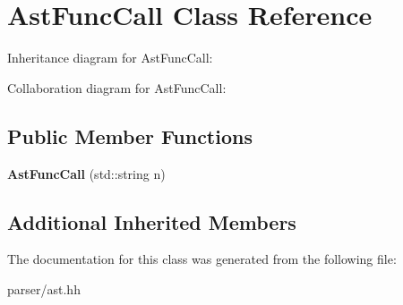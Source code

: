 \hypertarget{classAstFuncCall}{}\section{Ast\+Func\+Call Class Reference}
\label{classAstFuncCall}


Inheritance diagram for Ast\+Func\+Call\+:


Collaboration diagram for Ast\+Func\+Call\+:
\subsection*{Public Member Functions}
\begin{DoxyCompactItemize}
\item 
\mbox{\label{classAstFuncCall_a2ee7c8ccb1818844475b989974569f35}} 
{\bfseries Ast\+Func\+Call} (std\+::string n)
\end{DoxyCompactItemize}
\subsection*{Additional Inherited Members}


The documentation for this class was generated from the following file\+:\begin{DoxyCompactItemize}
\item 
parser/ast.\+hh\end{DoxyCompactItemize}
